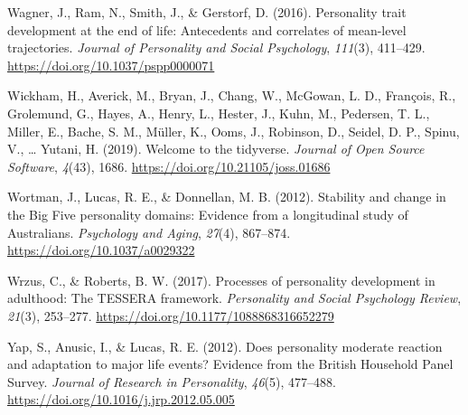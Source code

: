 \documentclass[
  english,
  man, noextraspace]{apa7}
\begin{document}
\leavevmode\hypertarget{ref-wagnerPersonalityTraitDevelopment2016}{}%
Wagner, J., Ram, N., Smith, J., \& Gerstorf, D. (2016). Personality trait development at the end of life: Antecedents and correlates of mean-level trajectories. \emph{Journal of Personality and Social Psychology}, \emph{111}(3), 411--429. \url{https://doi.org/10.1037/pspp0000071}

\leavevmode\hypertarget{ref-tidyverse2019}{}%
Wickham, H., Averick, M., Bryan, J., Chang, W., McGowan, L. D., François, R., Grolemund, G., Hayes, A., Henry, L., Hester, J., Kuhn, M., Pedersen, T. L., Miller, E., Bache, S. M., Müller, K., Ooms, J., Robinson, D., Seidel, D. P., Spinu, V., \ldots{} Yutani, H. (2019). Welcome to the tidyverse. \emph{Journal of Open Source Software}, \emph{4}(43), 1686. \url{https://doi.org/10.21105/joss.01686}

\leavevmode\hypertarget{ref-wortmanStabilityChangeBig2012}{}%
Wortman, J., Lucas, R. E., \& Donnellan, M. B. (2012). Stability and change in the Big Five personality domains: Evidence from a longitudinal study of Australians. \emph{Psychology and Aging}, \emph{27}(4), 867--874. \url{https://doi.org/10.1037/a0029322}

\leavevmode\hypertarget{ref-wrzusProcessesPersonalityDevelopment2017}{}%
Wrzus, C., \& Roberts, B. W. (2017). Processes of personality development in adulthood: The TESSERA framework. \emph{Personality and Social Psychology Review}, \emph{21}(3), 253--277. \url{https://doi.org/10.1177/1088868316652279}

\leavevmode\hypertarget{ref-yapDoesPersonalityModerate2012}{}%
Yap, S., Anusic, I., \& Lucas, R. E. (2012). Does personality moderate reaction and adaptation to major life events? Evidence from the British Household Panel Survey. \emph{Journal of Research in Personality}, \emph{46}(5), 477--488. \url{https://doi.org/10.1016/j.jrp.2012.05.005}

\endgroup


\clearpage
\makeatletter
\efloat@restorefloats
\makeatother
\end{document}

